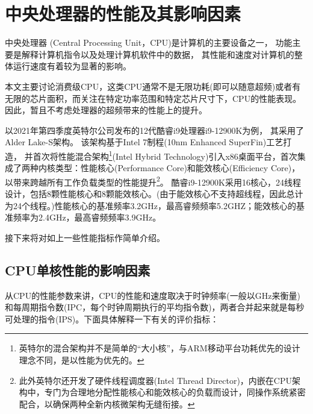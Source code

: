 \documentclass[final]{cvpr}
\begin{document}
\section{中央处理器的性能及其影响因素}\label{sec:CPU}

中央处理器 (Central Processing Unit，CPU)是计算机的主要设备之一，
功能主要是解释计算机指令以及处理计算机软件中的数据\cite{Web/wiki-cpu}，
其性能和速度对计算机的整体运行速度有着较为显著的影响。

本文主要讨论消费级CPU，这类CPU通常不是无限功耗(即可以随意超频)或者有无限的芯片面积，而关注在特定功率范围和特定芯片尺寸下，CPU的性能表现\cite{Web/zhihu1}。因此，暂且不考虑处理器的超频带来的性能上的提升。

以2021年第四季度英特尔公司发布的12代酷睿i9处理器i9-12900K为例，
其采用了Alder Lake-S架构。
该架构基于Intel 7制程(10nm Enhanced SuperFin)工艺打造，
并首次将性能混合架构\footnote{英特尔的混合架构并不是简单的“大小核”，与ARM移动平台功耗优先的设计理念不同，是以性能为优先的。}(Intel Hybrid Technology)引入x86桌面平台，首次集成了两种内核类型：性能核心(Performance Core)和能效核心(Efficiency Core)，以带来跨越所有工作负载类型的性能提升\footnote{此外英特尔还开发了硬件线程调度器(Intel Thread Director)，内嵌在CPU架构中，专门为合理地分配性能核心和能效核心的负载而设计，同操作系统紧密配合，以确保两种全新内核微架构无缝衔接。}。
酷睿i9-12900K采用16核心，24线程设计，包括8颗性能核心和8颗能效核心。(由于能效核心不支持超线程，因此总计为24个线程。)性能核心的基准频率3.2GHz，最高睿频频率5.2GHZ；能效核心的基准频率为2.4GHz，最高睿频频率3.9GHz。\cite{Web/i9-12900K}

接下来将对如上一些性能指标作简单介绍。

\subsection{\textbf{CPU单核性能的影响因素}}

从CPU的性能参数来讲，CPU的性能和速度取决于时钟频率(一般以GHz来衡量)和每周期指令数(IPC，每个时钟周期执行的平均指令数)，两者合并起来就是每秒可处理的指令(IPS)。下面具体解释一下有关的评价指标：
\end{document}
